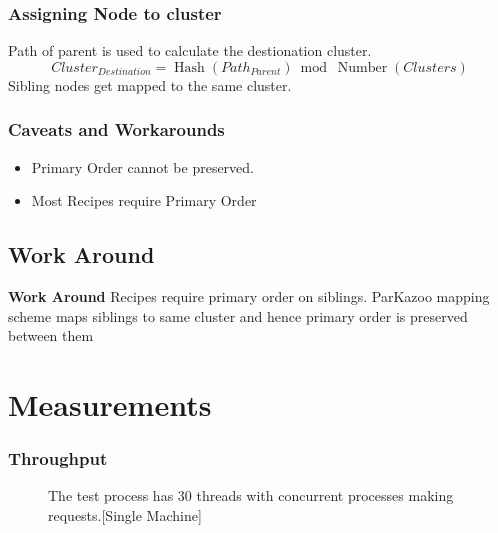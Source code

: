 \documentclass[10pt, compress]{beamer}
\DeclareMathOperator{\Hash}{Hash}
\DeclareMathOperator{\Number}{Number}
\begin{document}
\begin{frame}[fragile]
    \frametitle{Assigning Node to cluster}
    Path of parent is used to calculate the destionation cluster.
    \begin{equation}
        Cluster_{Destination} = \Hash(Path_{Parent})\bmod \Number(Clusters)
    \end{equation}
    Sibling nodes get mapped to the same cluster.
\end{frame}

\begin{frame}
    \frametitle{Caveats and Workarounds}
    \begin{itemize}
        \item Primary Order cannot be preserved.
        \item Most Recipes require Primary Order
    \end{itemize}
    \subsection{Work Around}{
        \textbf{Work Around}
        Recipes require primary order on siblings. ParKazoo mapping scheme maps siblings to same cluster and hence primary order is preserved between them
    }
\end{frame}

\section{Measurements}
\begin{frame}
    \frametitle{Throughput}
    \begin{figure}
    \caption {The test process has 30 threads with concurrent processes making requests.[Single Machine]}
  \end{figure}
\end{frame}
\end{document}
